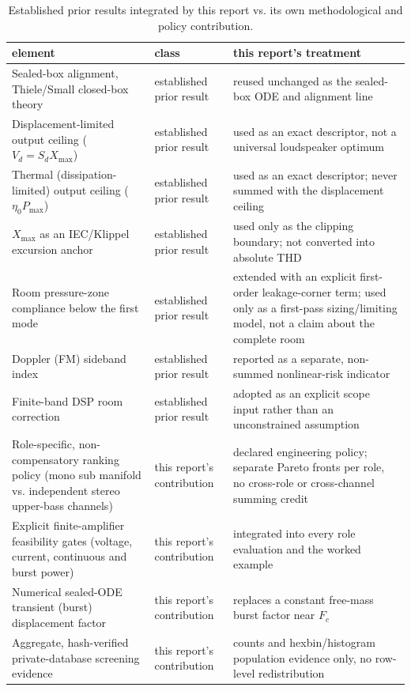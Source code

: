 \begin{table}[htbp]
\centering
\caption{Established prior results integrated by this report vs. its own methodological and policy contribution.}
\label{tab:prior-art}
\begin{tabular}{p{5.1cm}p{2.6cm}p{6.7cm}}
\toprule
element & class & this report's treatment\\
\midrule
Sealed-box alignment, Thiele/Small closed-box theory & established prior result & reused unchanged as the sealed-box ODE and alignment line\\
Displacement-limited output ceiling ($V_d=S_dX_{\max}$) & established prior result & used as an exact descriptor, not a universal loudspeaker optimum\\
Thermal (dissipation-limited) output ceiling ($\eta_0P_{\max}$) & established prior result & used as an exact descriptor; never summed with the displacement ceiling\\
$X_{\max}$ as an IEC/Klippel excursion anchor & established prior result & used only as the clipping boundary; not converted into absolute THD\\
Room pressure-zone compliance below the first mode & established prior result & extended with an explicit first-order leakage-corner term; used only as a first-pass sizing/limiting model, not a claim about the complete room\\
Doppler (FM) sideband index & established prior result & reported as a separate, non-summed nonlinear-risk indicator\\
Finite-band DSP room correction & established prior result & adopted as an explicit scope input rather than an unconstrained assumption\\
Role-specific, non-compensatory ranking policy (mono sub manifold vs. independent stereo upper-bass channels) & this report's contribution & declared engineering policy; separate Pareto fronts per role, no cross-role or cross-channel summing credit\\
Explicit finite-amplifier feasibility gates (voltage, current, continuous and burst power) & this report's contribution & integrated into every role evaluation and the worked example\\
Numerical sealed-ODE transient (burst) displacement factor & this report's contribution & replaces a constant free-mass burst factor near $F_c$\\
Aggregate, hash-verified private-database screening evidence & this report's contribution & counts and hexbin/histogram population evidence only, no row-level redistribution\\
\bottomrule
\end{tabular}
\end{table}
